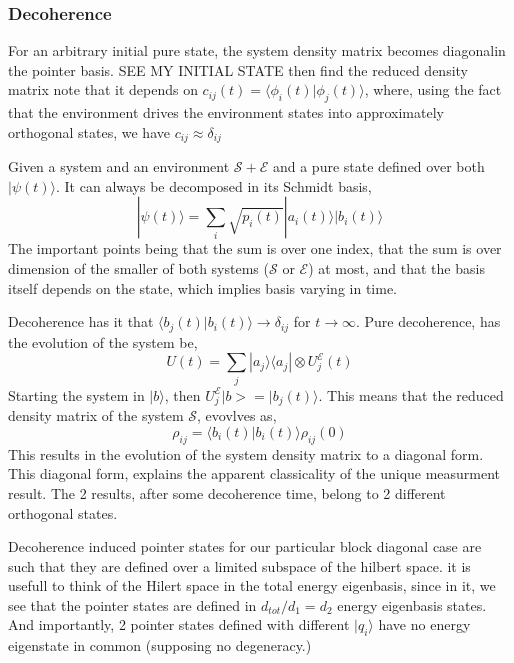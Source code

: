 \documentclass{article}
\begin{document}
\subsubsection{Decoherence}

For an arbitrary initial pure state, the system density matrix becomes diagonalin the pointer basis.
SEE MY INITIAL STATE
then find the reduced density matrix
note that it depends on $c_{ij}(t)=\langle \phi_i(t)|\phi_j(t) \rangle$, where, using the fact that the environment drives the environment states into approximately orthogonal states, we have $c_{ij}\approx \delta_{ij}$


Given a system and an environment $\mathcal{S} + \mathcal{E}$ and a pure state defined over both $|\psi(t)\rangle$. It can always be decomposed in its Schmidt basis,
\begin{equation}
    |\psi(t)\rangle = \sum_i \sqrt{p_i(t)}|a_i(t)\rangle|b_i(t)\rangle
\end{equation}
The important points being that the sum is over one index, that the sum is over dimension of the smaller of both systems ($\mathcal{S}$ or $\mathcal{E}$) at most, and that the basis itself depends on the state, which implies basis varying in time.

Decoherence has it that $\langle b_j(t)|b_i(t)\rangle\rightarrow \delta_{ij}$ for $t\rightarrow \infty$. 
Pure decoherence, has the evolution of the system be,
\begin{equation}
    U(t)=\sum_j|a_j\rangle\langle a_j|\otimes U^{\mathcal{E}}_j(t)
\end{equation}
Starting the system in $|b\rangle$, then $U_j^{\mathcal{E}}|b>=|b_j(t)\rangle$. This means that the reduced density matrix of the system $\mathcal{S}$, evovlves as,
\begin{equation}
    \rho_{ij} = \langle b_i(t)|b_i(t)\rangle \rho_{ij}(0)
\end{equation}
This results in the evolution of the system density matrix to a diagonal form. This diagonal form, explains the apparent classicality of the unique measurment result. The 2 results, after some decoherence time, belong to 2 different orthogonal states. 


Decoherence induced pointer states for our particular block diagonal case are such that they are defined over a limited subspace of the hilbert space. it is usefull to think of the Hilert space in the total energy eigenbasis, since in it, we see that the pointer states are defined in $d_{tot}/d_1=d_2$ energy eigenbasis states. And importantly, 2 pointer states defined with different $|q_i\rangle$ have no energy eigenstate in common (supposing no degeneracy.)
\end{document}
